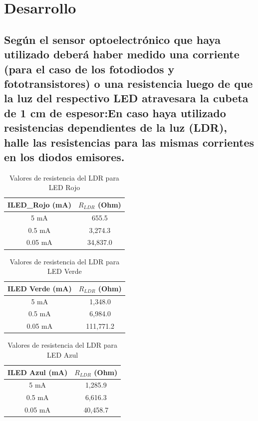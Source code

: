 \chapter{Desarrollo}

\section{Según el sensor optoelectrónico que haya utilizado deberá haber medido una corriente (para el
caso de los fotodiodos y fototransistores) o una resistencia luego de que la luz del respectivo LED
atravesara la cubeta de 1 cm de espesor:En caso haya utilizado resistencias dependientes de la luz (LDR), halle las resistencias para las
mismas corrientes en los diodos emisores.}
\begin{table}[h]
\centering
\begin{tabular}{|c|c|}
\hline
ILED_Rojo (mA) & \( R_{LDR} \) (Ohm) \\
\hline
5 mA    & 655.5 \\
\hline
0.5 mA  & 3,274.3 \\
\hline
0.05 mA & 34,837.0 \\
\hline
\end{tabular}
\caption{Valores de resistencia del LDR para LED Rojo}
\end{table}

\begin{table}[h]
\centering
\begin{tabular}{|c|c|}
\hline
ILED Verde (mA) & \( R_{LDR} \) (Ohm) \\
\hline
5 mA    & 1,348.0 \\
\hline
0.5 mA  & 6,984.0 \\
\hline
0.05 mA & 111,771.2 \\
\hline
\end{tabular}
\caption{Valores de resistencia del LDR para LED Verde}
\end{table}
\begin{table}[h]
\centering
\begin{tabular}{|c|c|}
\hline
ILED Azul (mA) & \( R_{LDR} \) (Ohm) \\
\hline
5 mA    & 1,285.9 \\
\hline
0.5 mA  & 6,616.3 \\
\hline
0.05 mA & 40,458.7 \\
\hline
\end{tabular}
\caption{Valores de resistencia del LDR para LED Azul}
\label{tab:resistencia-ldr}
\end{table}

